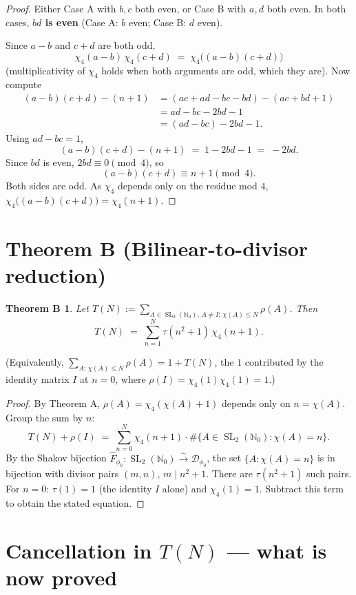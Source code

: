 \documentclass[11pt]{article}
\newtheorem*{theoremB}{Theorem B}
\DeclareMathOperator{\SL}{SL}
\begin{document}
\begin{proof}
Either Case A with $b, c$ both even, or Case B with $a, d$ both even. In
both cases, \textbf{$bd$ is even} (Case A: $b$ even; Case B: $d$ even).

Since $a-b$ and $c+d$ are both odd,
\[
\chi_4(a-b)\,\chi_4(c+d) \;=\; \chi_4\bigl((a-b)(c+d)\bigr)
\]
(multiplicativity of $\chi_4$ holds when both arguments are odd, which they
are). Now compute
\begin{align*}
(a-b)(c+d) - (n+1) &= (ac + ad - bc - bd) - (ac + bd + 1) \\
&= ad - bc - 2bd - 1 \\
&= (ad - bc) - 2bd - 1.
\end{align*}
Using $ad - bc = 1$,
\[
(a-b)(c+d) - (n+1) \;=\; 1 - 2bd - 1 \;=\; -2bd.
\]
Since $bd$ is even, $2bd \equiv 0 \pmod 4$, so
\[
(a-b)(c+d) \equiv n+1 \pmod 4.
\]
Both sides are odd. As $\chi_4$ depends only on the residue mod $4$,
$\chi_4\bigl((a-b)(c+d)\bigr) = \chi_4(n+1)$.
\end{proof}

\section{Theorem B (Bilinear-to-divisor reduction)}

\begin{theoremB}
Let $T(N) := \sum_{A \in \SL_2(\mathbb{N}_0),\, A \ne I:\, \chi(A) \le N} \rho(A)$.
Then
\[
T(N) \;=\; \sum_{n=1}^{N} \tau(n^2+1)\,\chi_4(n+1).
\]
\end{theoremB}

(Equivalently, $\sum_{A:\,\chi(A) \le N} \rho(A) = 1 + T(N)$, the $1$
contributed by the identity matrix $I$ at $n=0$, where
$\rho(I) = \chi_4(1)\chi_4(1) = 1$.)

\begin{proof}
By Theorem A, $\rho(A) = \chi_4(\chi(A)+1)$ depends only on $n = \chi(A)$.
Group the sum by $n$:
\[
T(N) + \rho(I) \;=\; \sum_{n=0}^{N} \chi_4(n+1) \cdot
\#\{A \in \SL_2(\mathbb{N}_0) : \chi(A) = n\}.
\]
By the Shakov bijection
$\widehat F_{\phi_0} : \SL_2(\mathbb{N}_0) \xrightarrow{\sim}
\mathcal{D}_{\phi_0}$, the set $\{A : \chi(A) = n\}$ is in bijection with
divisor pairs $(m, n)$, $m \mid n^2+1$. There are $\tau(n^2+1)$ such pairs.
For $n = 0$: $\tau(1) = 1$ (the identity $I$ alone) and $\chi_4(1) = 1$.
Subtract this term to obtain the stated equation.
\end{proof}

\section{Cancellation in $T(N)$ --- what is now proved}
\end{document}
